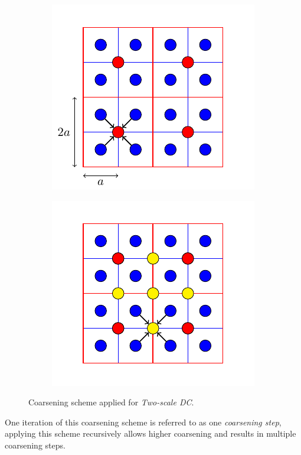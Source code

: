 \begin{figure}
\begin{subfigure}{.45\textwidth}
\begin{center}
\includegraphics[scale=1]{Pictures/tikzCoarsen/coarsen.pdf}
\end{center}
\label{sfig:coarsenA}
\end{subfigure}\hfill
\begin{subfigure}{.45\textwidth}
\begin{center}
\includegraphics[scale=1]{Pictures/tikzCoarsen/coarsenMani.pdf}
\end{center}
\label{sfig:coarsenB}
\end{subfigure}
\caption{Coarsening scheme applied for \emph{Two-scale \acl{DC}}.}
\label{fig:coarsen}
\end{figure}
One iteration of this coarsening scheme is referred to as one \emph{coarsening step}, applying this scheme recursively allows higher coarsening and results in multiple coarsening steps.

